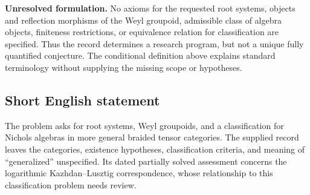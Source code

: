 \documentclass[11pt]{article}
\begin{document}
\textbf{Unresolved formulation.} No axioms for the requested root systems, objects and reflection morphisms of the Weyl groupoid, admissible class of algebra objects, finiteness restrictions, or equivalence relation for classification are specified. Thus the record determines a research program, but not a unique fully quantified conjecture. The conditional definition above explains standard terminology without supplying the missing scope or hypotheses.
\subsection{Short English statement}
The problem asks for root systems, Weyl groupoids, and a classification for Nichols algebras in more general braided tensor categories. The supplied record leaves the categories, existence hypotheses, classification criteria, and meaning of ``generalized'' unspecified. Its dated partially solved assessment concerns the logarithmic Kazhdan--Lusztig correspondence, whose relationship to this classification problem needs review.
\end{document}
